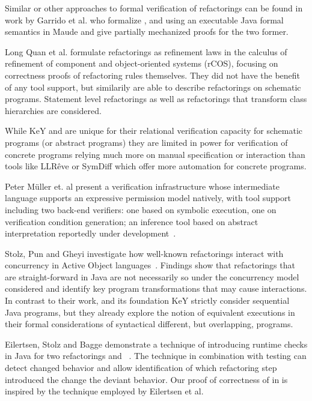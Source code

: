 Similar or other approaches to formal verification of refactorings can be found in work by
Garrido et al. \cite{garrido2006formal} who formalize ,
 and  using an executable
Java formal semantics in Maude and give partially mechanized proofs for the two former.

Long Quan et al. \cite{DBLP:conf/isola/QuanQL08} formulate refactorings as refinement
laws in the calculus of refinement of component and object-oriented systems (rCOS),
focusing on correctness proofs of refactoring rules themselves.
They did not have the benefit of any tool support, but similarily are able to describe
refactorings on schematic programs.
Statement level refactorings as well as refactorings that transform class hierarchies are considered.

While KeY and \Refinity{} are unique for their relational verification capacity for
schematic programs (or abstract programs) they are limited in power for verification
of concrete programs relying much more on manual specification or interaction \cite{DBLP:conf/aplas/Steinhofel20}
than tools like LLRêve \cite{DBLP:journals/jar/KieferKU18} or SymDiff \cite{DBLP:conf/cav/LahiriHKR12}
which offer more automation for concrete programs.

Peter M{\"u}ller et. al present a verification infrastructure whose intermediate language supports
an expressive permission model natively, with tool support including two back-end verifiers: one based on
symbolic execution, one on verification condition generation; an inference tool based on abstract
interpretation reportedly under development~\cite{DBLP:series/natosec/0001SS17}.

Stolz, Pun and Gheyi investigate how well-known refactorings interact with concurrency in Active Object languages~\cite{DBLP:conf/isola/StolzPG20}.
Findings show that refactorings that are straight-forward in Java are not necessarily so under the concurrency model considered and identify key
program transformations that may cause interactions.
In contrast to their work, \Refinity{} and its foundation KeY strictly consider sequential Java programs,
but they already explore the notion of equivalent executions in their formal considerations of syntactical different, but overlapping, programs.

Eilertsen, Stolz and Bagge demonstrate a technique of introducing runtime checks in Java for two refactorings  and
~\cite{stolz:isolarefa}. The technique in combination with testing can detect changed behavior and allow identification
of which refactoring step introduced the change the deviant behavior.
Our proof of correctness of  in \Refinity{} is inspired by the technique employed by Eilertsen et al.


